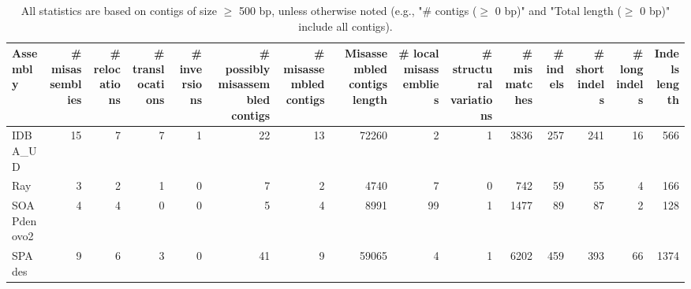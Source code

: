 \documentclass[12pt,a4paper]{article}
\begin{document}
\begin{table}[ht]
\begin{center}
\caption{All statistics are based on contigs of size $\geq$ 500 bp, unless otherwise noted (e.g., "\# contigs ($\geq$ 0 bp)" and "Total length ($\geq$ 0 bp)" include all contigs).}
\begin{tabular}{|l*{14}{|r}|}
\hline
Assembly & \# misassemblies &     \# relocations &     \# translocations &     \# inversions & \# possibly misassembled contigs & \# misassembled contigs & Misassembled contigs length & \# local misassemblies & \# structural variations & \# mismatches & \# indels &     \# short indels &     \# long indels & Indels length \\ \hline
IDBA\_UD & 15 & 7 & 7 & 1 & 22 & 13 & 72260 & 2 & 1 & 3836 & 257 & 241 & 16 & 566 \\ \hline
Ray & 3 & 2 & 1 & 0 & 7 & 2 & 4740 & 7 & 0 & 742 & 59 & 55 & 4 & 166 \\ \hline
SOAPdenovo2 & 4 & 4 & 0 & 0 & 5 & 4 & 8991 & 99 & 1 & 1477 & 89 & 87 & 2 & 128 \\ \hline
SPAdes & 9 & 6 & 3 & 0 & 41 & 9 & 59065 & 4 & 1 & 6202 & 459 & 393 & 66 & 1374 \\ \hline
\end{tabular}
\end{center}
\end{table}
\end{document}
